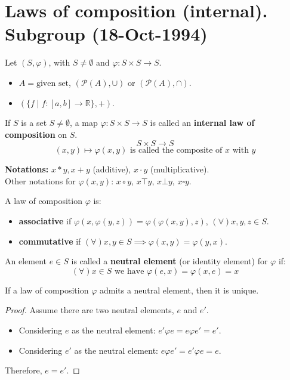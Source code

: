 \section{Laws of composition (internal). Subgroup (18-Oct-1994)}

Let $(S, \varphi)$, with $S \neq \emptyset$ and $\varphi: S \times S \to S$.

\begin{example}\leavevmode
\begin{itemize}
    \item $A = \text{given set}$, $(\mathcal{P}(A), \cup)$ or $(\mathcal{P}(A), \cap)$.
    \item $(\{f \mid f: [a, b] \to \mathbb{R}\}, +)$.
\end{itemize}
\end{example}

\begin{definition}
If $S$ is a set $S \neq \emptyset$, a map $\varphi: S \times S \to S$ is called an \textbf{internal law of composition} on $S$.
$$ S \times S \to S $$
$$ (x, y) \mapsto \varphi(x, y) \text{ is called the composite of } x \text{ with } y $$
\end{definition}

\textbf{Notations:} $x * y, x + y$ (additive), $x \cdot y$ (multiplicative). \\
Other notations for $\varphi(x, y)$: $x \circ y$, $x \top y$, $x \bot y$, $x \square y$.

\begin{definition}[Properties]
A law of composition $\varphi$ is:
\begin{itemize}
    \item \textbf{associative} if $\varphi(x, \varphi(y, z)) = \varphi(\varphi(x, y), z)$, $(\forall) x, y, z \in S$.
    \item \textbf{commutative} if $(\forall) x, y \in S \implies \varphi(x, y) = \varphi(y, x)$.
\end{itemize}
\end{definition}

\begin{definition}
An element $e \in S$ is called a \textbf{neutral element} (or identity element) for $\varphi$ if:
$$ (\forall) x \in S \text{ we have } \varphi(e, x) = \varphi(x, e) = x $$
\end{definition}

\begin{proposition}
If a law of composition $\varphi$ admits a neutral element, then it is unique.
\end{proposition}
\begin{proof}
Assume there are two neutral elements, $e$ and $e'$.
\begin{itemize}
    \item Considering $e$ as the neutral element: $e' \varphi e = e \varphi e' = e'$.
    \item Considering $e'$ as the neutral element: $e \varphi e' = e' \varphi e = e$.
\end{itemize}
Therefore, $e = e'$.
\end{proof}

